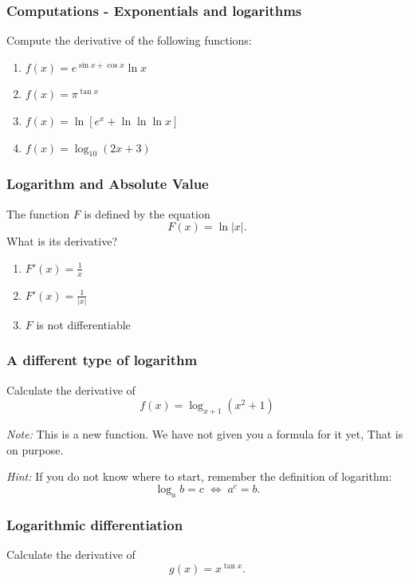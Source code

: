 \documentclass[14pt]{beamer}
\newcommand {\DS} [1] {${\displaystyle #1}$}
\newcommand{\p}{\pause}
\begin{document}
\begin{frame}[t]
\frametitle{Computations - Exponentials and logarithms}



Compute the derivative of the following functions:

\begin{enumerate}
	\item  \DS{f(x) = e^{\sin x + \cos x} \ln x}
\vfill
	\item  \DS{f(x) = \pi^{\tan x}}
\vfill
	\item  \DS{f(x) = \ln \left[ e^x + \ln  \ln  \ln x  \right]}
\vfill
	\item \DS{f(x) = \log_{10} \left( 2x + 3 \right)}
\vfill
\end{enumerate}


\end{frame}
\begin{frame}[t]
\frametitle{Logarithm and Absolute Value}

The function $F$ is defined by the equation
	$$F(x) = \ln |x| .$$
What is its derivative?
\vfill
	\begin{enumerate}
		\item  \DS{F'(x) = \frac{1}{x}}
\vfill
		\item  \DS{F'(x) = \frac{1}{|x|}}
\vfill
		\item  $F$ is not differentiable
\vfill
	\end{enumerate}
\end{frame}
\begin{frame}[t]
\frametitle{A different type of logarithm}

Calculate the derivative of 
	$$
		f(x) = \log_{x+1} (x^2+1)
	$$
	
\vfill

\emph{Note:}  This is a new function.  We have not given you a formula for it yet,  That is on purpose.

\vfill \p

\emph{Hint:}  If you do not know where to start, remember the definition of logarithm:
	$$
	\log_a b = c \; \iff \; a^c = b.
	$$
	

\end{frame}
\begin{frame}[t]
\frametitle{Logarithmic differentiation}

\vspace{5mm} 
	\begin{block}{}
Calculate the derivative of 
	$$
		g(x)  = x^{\tan x}.
	$$
	\end{block}

\end{frame}
\end{document}

